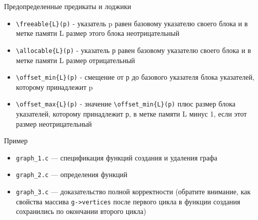 \documentclass[hyperref={unicode=true}]{beamer}
\begin{document}
    \begin{frame}{Предопределенные предикаты и лоджики}
    \begin{itemize}
    \item \texttt{\textbackslash freeable\{L\}(p)} -
    указатель p равен базовому указателю своего блока и в метке памяти L размер
    этого блока неотрицательный
    \item \texttt{\textbackslash allocable\{L\}(p)} -
    указатель р равен базовому указателю своего блока и в метке памяти L
    размер отрицательный
    \item \texttt{\textbackslash offset\_min\{L\}(p)} - смещение от р до
    базового указателя блока указателей, которому принадлежит p
    \item \texttt{\textbackslash offset\_max\{L\}(p)} - значение
    \texttt{\textbackslash offset\_min\{L\}(p)} плюс размер блока указателей,
    которому принадлежит р, в метке памяти L минус 1, если этот размер
    неотрицательный
    \end{itemize}
    \end{frame}

    \begin{frame}{Пример}
    \begin{itemize}
    \item \texttt{graph\_1.c} --- спецификация функций создания и удаления
    графа
    \item \texttt{graph\_2.c} --- определения функций
    \item \texttt{graph\_3.c} --- доказательство полной корректности
    (обратите внимание, как свойства массива \texttt{g->vertices} после
     первого цикла в функции создания сохранились по окончании второго цикла)
    \end{itemize}
    \end{frame}
\end{document}
